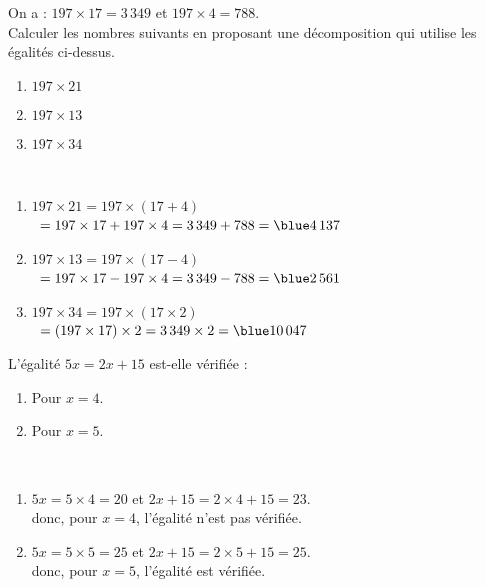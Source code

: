 \begin{colonne*exercice}
\bigskip


\begin{exercice} %
   On a : $197\times17 =3\,349$ et $197\times4 =788$. \\
   Calculer les nombres suivants en proposant une décomposition qui utilise les égalités ci-dessus.
   \begin{enumerate}
      \item $197\times21$
      \item $197\times13$
      \item $197\times34$
   \end{enumerate}
\end{exercice}

\begin{corrige}
   \ \\ [-5mm]
   \begin{enumerate}
      \item $197\times21 =197\times(17+4) $\\
         \quad\, $=197\times17+197\times4 =3\,349+788 =\blue 4\,137$
      \item $197\times13 =197\times(17-4)$ \\
         \quad\, $=197\times17-197\times4 =3\,349-788 =\blue 2\,561$
     \item $197\times34 =197\times(17\times2)$ \\
         \quad\, $=(197\times17)\times2 =3\,349\times2 =\blue 10\,047$
   \end{enumerate}
\end{corrige}

\bigskip


\begin{exercice} %
   L'égalité $5x =2x+15$ est-elle vérifiée :
   \begin{enumerate}
      \item Pour $x =4$.
      \item Pour $x =5$.
   \end{enumerate}
\end{exercice}

\begin{corrige}
   \ \\ [-5mm]
   \begin{enumerate}
      \item $5x =5\times4 =20$ et $2x+15 =2\times4+15 =23$. \\
       donc, pour $x =4$, {\blue l'égalité n'est pas vérifiée}.
      \item $5x =5\times5 =25$ et $2x+15=2\times5+15 =25$. \\
       donc, pour $x =5$, {\blue l'égalité est vérifiée.}
   \end{enumerate}
\end{corrige}


\end{colonne*exercice}
